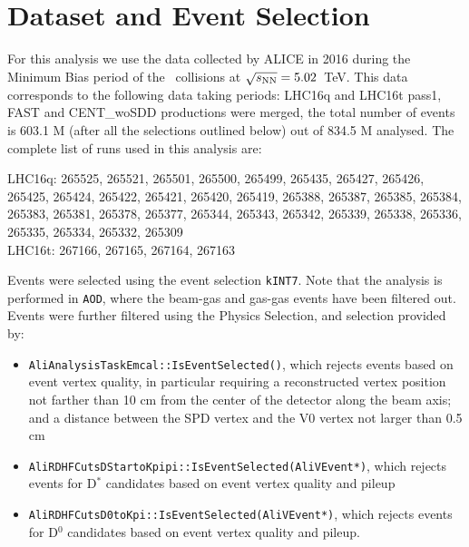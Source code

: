 
\section{Dataset and Event Selection}

For this analysis we use the data collected by ALICE in 2016 during the Minimum Bias period of the \pPb\ collisions at $\sqrt{s_{\rm NN}}=5.02$~TeV. This data corresponds to the following data taking periods:
LHC16q and LHC16t pass1, FAST and CENT\_woSDD productions were merged, the total number of events is 603.1 M (after all the selections outlined below) out of 834.5 M analysed.
The complete list of runs used in this analysis are:

LHC16q: 265525, 265521, 265501, 265500, 265499, 265435, 265427, 265426, 265425, 265424, 265422, 265421, 265420, 265419, 265388, 265387, 265385, 265384, 265383, 265381, 265378, 265377, 265344, 265343, 265342, 265339, 265338, 265336, 265335, 265334, 265332, 265309  \\
LHC16t: 267166, 267165, 267164, 267163 

Events were selected using the event selection \texttt{kINT7}. Note that the analysis is performed in \texttt{AOD}, where the beam-gas and gas-gas events have been filtered out.
Events were further filtered using the Physics Selection, and selection provided by:
\begin{itemize}
\item \texttt{AliAnalysisTaskEmcal::IsEventSelected()}, which rejects events based on event vertex quality, in particular requiring a reconstructed vertex position not farther than 10 cm from the center of the detector along the beam axis; and a distance between the SPD vertex and the V0 vertex not larger than 0.5 cm %
\item \texttt{AliRDHFCutsDStartoKpipi::IsEventSelected(AliVEvent*)}, which rejects events for D$^*$ candidates based on event vertex quality and pileup
\item \texttt{AliRDHFCutsD0toKpi::IsEventSelected(AliVEvent*)}, which rejects events for D$^0$ candidates based on event vertex quality and pileup.
\end{itemize}

